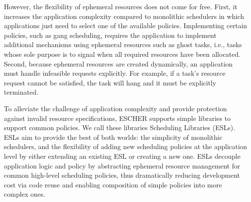 However, the flexibility of ephemeral resources does not come for free. First, it increases the application complexity compared to monolithic schedulers in which applications just need to select one of the available policies. Implementing certain policies, such as gang scheduling, requires the application to implement additional mechanisms using ephemeral resources such as ghost tasks, i.e., tasks whose sole purpose is to signal when all required resources have been allocated. Second, because ephemeral resources are created dynamically, an application must handle infeasible requests explicitly. For example, if a task's resource request cannot be satisfied, the task will hang and it must be explicitly terminated.%


To alleviate the challenge of application complexity and provide protection against invalid resource specifications, ESCHER supports  simple libraries to support common policies. We call these libraries \name{} Scheduling Libraries (ESLs). ESLs aim to provide the best of both worlds: the simplicity of monolithic schedulers, and the flexibility of adding new scheduling policies at the application level by either extending an existing ESL or creating a new one. ESLs decouple application logic and policy by abstracting ephemeral resource management for common high-level scheduling policies, thus dramatically reducing development cost via code reuse and enabling composition of simple policies into more complex ones. %


